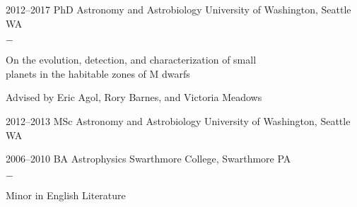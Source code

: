 \documentclass[]{luger-cv} %
\begin{document}
\begin{entrylist}


    \entry
    {2012--2017}
    {PhD {\normalfont Astronomy and Astrobiology}}
    {University of Washington, Seattle WA}
    {%
        \vspace{-1em}
        \begin{list}{{\color{numcolor}$-$}}{\cvlist}
            \item On the evolution, detection, and characterization of small \\ planets in the habitable zones of M dwarfs
            \item Advised by Eric Agol, Rory Barnes, and Victoria Meadows
        \end{list}
    }


    \entry
    {2012--2013}
    {MSc {\normalfont Astronomy and Astrobiology}}
    {University of Washington, Seattle WA}


    \entry
    {2006--2010}
    {BA {\normalfont Astrophysics}}
    {Swarthmore College, Swarthmore PA}
    {\vspace{-1em}
        \begin{list}{{\color{numcolor}$-$}}{\cvlist}
            \item Minor in English Literature
        \end{list}}


\end{entrylist}


\end{document}
